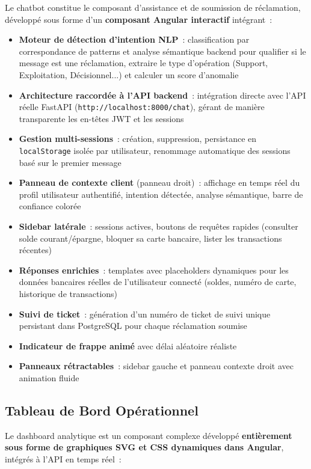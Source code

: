 \documentclass[12pt,a4paper]{report}
\begin{document}
Le chatbot constitue le composant d'assistance et de soumission de réclamation, développé sous forme d'un \textbf{composant Angular interactif} intégrant~:

\begin{itemize}[noitemsep]
    \item \textbf{Moteur de détection d'intention NLP}~: classification par correspondance de patterns et analyse sémantique backend pour qualifier si le message est une réclamation, extraire le type d'opération (Support, Exploitation, Décisionnel...) et calculer un score d'anomalie
    \item \textbf{Architecture raccordée à l'API backend}~: intégration directe avec l'API réelle FastAPI (\texttt{http://localhost:8000/chat}), gérant de manière transparente les en-têtes JWT et les sessions
    \item \textbf{Gestion multi-sessions}~: création, suppression, persistance en \texttt{localStorage} isolée par utilisateur, renommage automatique des sessions basé sur le premier message
    \item \textbf{Panneau de contexte client} (panneau droit)~: affichage en temps réel du profil utilisateur authentifié, intention détectée, analyse sémantique, barre de confiance colorée
    \item \textbf{Sidebar latérale}~: sessions actives, boutons de requêtes rapides (consulter solde courant/épargne, bloquer sa carte bancaire, lister les transactions récentes)
    \item \textbf{Réponses enrichies}~: templates avec placeholders dynamiques pour les données bancaires réelles de l'utilisateur connecté (soldes, numéro de carte, historique de transactions)
    \item \textbf{Suivi de ticket}~: génération d'un numéro de ticket de suivi unique persistant dans PostgreSQL pour chaque réclamation soumise
    \item \textbf{Indicateur de frappe animé} avec délai aléatoire réaliste
    \item \textbf{Panneaux rétractables}~: sidebar gauche et panneau contexte droit avec animation fluide
\end{itemize}

\subsection{Tableau de Bord Opérationnel}

Le dashboard analytique est un composant complexe développé \textbf{entièrement sous forme de graphiques SVG et CSS dynamiques dans Angular}, intégrés à l'API en temps réel~:
\end{document}
